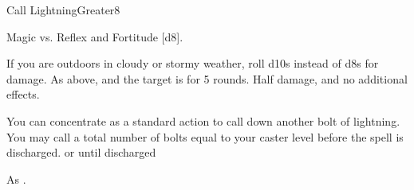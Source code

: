 \begin{spellsection}{Call Lightning}{Greater}{8}
\begin{spellheader}
\end{spellheader}
\begin{spellcontent}
    \begin{spelltargetinginfo}
    \end{spelltargetinginfo}
    \begin{spelleffects}
        \begin{spellattack}{Magic vs. Reflex and Fortitude}
            \spellsuccess[Reflex] [d8].
            
            If you are outdoors in cloudy or stormy weather, roll d10s instead of d8s for damage.
             As above, and the target is \staggered for 5 rounds.
            \spellfailure[Reflex] Half damage, and no additional effects.
        \end{spellattack}
        \spelleffect You can concentrate as a standard action to call down another bolt of lightning. You may call a total number of bolts equal to your caster level before the spell is discharged.
        \spelldur \durmed or until discharged \dismissable
    \end{spelleffects}
\end{spellcontent}
\begin{spellfooter}
    \spellnotes As .
\end{spellfooter}
\end{spellsection}

